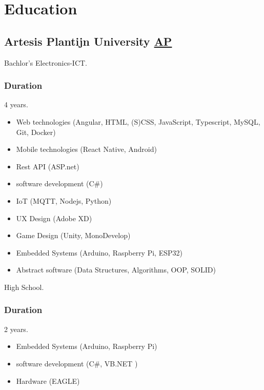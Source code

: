 \section{Educat\textcolor{mycolor}{ion}}
  \subsection{Artesis Plantijn University \href{https://ap.be}{AP}}
    \hspace*{\fill}{\textcolor{mygrey}{2018-2022}}

    Bachlor's Electronics-ICT.
    \subsubsection{Duration}
      4 years.
      \begin{itemize}
        \item Web technologies (Angular, HTML, (S)CSS, JavaScript, Typescript, MySQL, Git, Docker)
        \item Mobile technologies (React Native, Android)
        \item Rest API (ASP.net)
        \item software development (C#)
        \item IoT (MQTT, Nodejs, Python)
        \item UX Design (Adobe XD)
        \item Game Design (Unity, MonoDevelop)
        \item Embedded Systems (Arduino, Raspberry Pi, ESP32)
        \item Abstract software (Data Structures, Algorithms, OOP, SOLID)
      \end{itemize}
    High School.
    \subsubsection{Duration}
      2 years.
      \begin{itemize}
        \item Embedded Systems (Arduino, Raspberry Pi)
        \item software development (C#, VB.NET )
        \item Hardware (EAGLE)
      \end{itemize}
